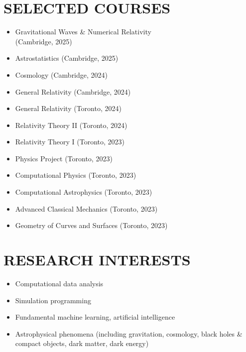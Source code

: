 \documentclass[a4paper,10pt]{extarticle}
\begin{document}
\newpage

\section*{SELECTED COURSES}
\begin{multicols}{2}
\begin{itemize}
    \item Gravitational Waves \& Numerical Relativity \\(Cambridge, 2025)
    \item Astrostatistics (Cambridge, 2025)
    \item Cosmology (Cambridge, 2024)
    \item General Relativity (Cambridge, 2024)
    \item General Relativity (Toronto, 2024)
    \item Relativity Theory II (Toronto, 2024)
    \item Relativity Theory I (Toronto, 2023)
    \item Physics Project (Toronto, 2023)
    \item Computational Physics (Toronto, 2023)
    \item Computational Astrophysics (Toronto, 2023)
    \item Advanced Classical Mechanics (Toronto, 2023)
    \item Geometry of Curves and Surfaces (Toronto, 2023)
\end{itemize}
\end{multicols}

\section*{RESEARCH INTERESTS}
\begin{itemize}
    \item Computational data analysis

    \item Simulation programming

    \item Fundamental machine learning, artificial intelligence
    
    \item Astrophysical phenomena (including gravitation, cosmology, black holes \& compact objects, dark matter, dark energy)
\end{itemize}


\end{document}
